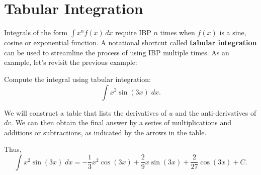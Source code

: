 \documentclass[handout]{ximera}
\begin{document}
\section{Tabular Integration}

Integrals of the form $\int x^n f(x) \,dx$ require IBP $n$ times when $f(x)$ is a sine, cosine or exponential function.
A notational shortcut called \textbf{tabular integration} can be used to streamline the process of using IBP multiple times.
As an example, let's revisit the previous example:

\begin{example}[example 4]
Compute the integral using tabular integration:
  \[
  \int x^2\sin(3x) \;dx.
  \]

We will construct a table that lists the derivatives of $u$ and the anti-derivatives of $dv$.
We can then obtain the final answer by a series of multiplications and additions or subtractions, as indicated
by the arrows in the table.


\begin{image}[5cm]
\end{image}

Thus,
\[
  \int x^2\sin(3x) \;dx = -\frac13 x^2\cos(3x) + \frac29x\sin(3x) + \frac{2}{27} \cos(3x) + C.
  \]

\end{example}
\end{document}
